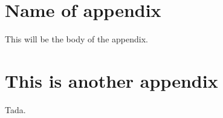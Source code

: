 \documentclass[reprint,english,notitlepage]{revtex4-1}  %
\numberwithin{equation}{section}
\begin{document}
\newpage
\appendix
\section{Name of appendix}
This will be the body of the appendix.
\section{This is another appendix}\label{appendix}
Tada.



\end{document}
